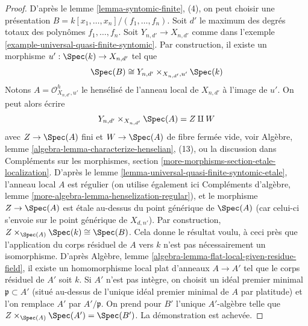 \begin{proof}
\medskip\noindent
D'après le lemme \ref{lemma-syntomic-finite}, (4), on peut choisir une présentation\newline
$B = k[x_1, \ldots, x_n]/(f_1, \ldots, f_n)$.\newline
Soit $d'$ le maximum des degrés totaux des polynômes $f_1, \ldots, f_n$.
Soit $Y_{n, d'} \to X_{n, d'}$ comme dans
l'exemple \ref{example-universal-quasi-finite-syntomic}.
Par construction, il existe un morphisme $u' : \Spec(k) \to X_{n, d'}$
tel que
$$
\Spec(B) \cong Y_{n, d'} \times_{X_{n, d'}, u'} \Spec(k)
$$
Notons $A = \mathcal{O}_{X_{n, d'}, u'}^h$ le hensélisé de
l'anneau local de $X_{n, d'}$ à l'image de $u'$. On peut alors écrire
$$
Y_{n, d'} \times_{X_{n, d'}} \Spec(A) = Z \amalg W
$$
avec $Z \to \Spec(A)$ fini et $W \to \Spec(A)$ de fibre
fermée vide, voir
Algèbre, lemme \ref{algebra-lemma-characterize-henselian}, (13),
ou la discussion dans Compléments sur les morphismes, section
\ref{more-morphisms-section-etale-localization}.
D'après le lemme \ref{lemma-universal-quasi-finite-syntomic-etale},
l'anneau local $A$ est régulier (on utilise également ici
Compléments d'algèbre, lemme \ref{more-algebra-lemma-henselization-regular}),
et le morphisme $Z \to \Spec(A)$ est étale au-dessus du point générique de
$\Spec(A)$ (car celui-ci s'envoie sur le point générique de $X_{d, n'}$).
Par construction, $Z \times_{\Spec(A)} \Spec(k) \cong \Spec(B)$.
Cela donne le résultat voulu, à ceci près que l'application du
corps résiduel de $A$ vers $k$ n'est pas nécessairement un isomorphisme.
D'après Algèbre, lemme \ref{algebra-lemma-flat-local-given-residue-field},
il existe un homomorphisme local plat d'anneaux $A \to A'$ tel que le corps résiduel
de $A'$ soit $k$. Si $A'$ n'est pas intègre, on choisit un
idéal premier minimal $\mathfrak p \subset A'$ (situé au-dessus de
l'unique idéal premier minimal de $A$ par platitude) et l'on remplace
$A'$ par $A'/\mathfrak p$. On prend pour $B'$ l'unique $A'$-algèbre
telle que $Z \times_{\Spec(A)} \Spec(A') = \Spec(B')$.
La démonstration est achevée.
\end{proof}

